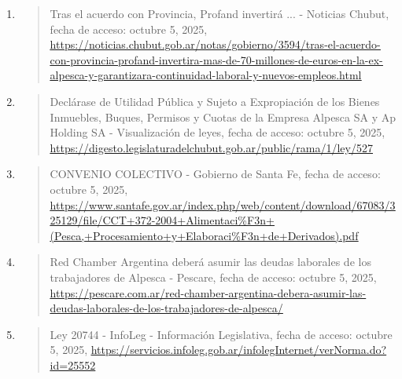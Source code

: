 \documentclass[]{article}
\begin{document}
\begin{enumerate}
\def\labelenumi{\arabic{enumi}.}
\item
  \begin{quote}
  Tras el acuerdo con Provincia, Profand invertirá ... - Noticias
  Chubut, fecha de acceso: octubre 5, 2025,
  \href{https://noticias.chubut.gob.ar/notas/gobierno/3594/tras-el-acuerdo-con-provincia-profand-invertira-mas-de-70-millones-de-euros-en-la-ex-alpesca-y-garantizara-continuidad-laboral-y-nuevos-empleos.html}{\uline{https://noticias.chubut.gob.ar/notas/gobierno/3594/tras-el-acuerdo-con-provincia-profand-invertira-mas-de-70-millones-de-euros-en-la-ex-alpesca-y-garantizara-continuidad-laboral-y-nuevos-empleos.html}}
  \end{quote}
\item
  \begin{quote}
  Declárase de Utilidad Pública y Sujeto a Expropiación de los Bienes
  Inmuebles, Buques, Permisos y Cuotas de la Empresa Alpesca SA y Ap
  Holding SA - Visualización de leyes, fecha de acceso: octubre 5, 2025,
  \href{https://digesto.legislaturadelchubut.gob.ar/public/rama/1/ley/527}{\uline{https://digesto.legislaturadelchubut.gob.ar/public/rama/1/ley/527}}
  \end{quote}
\item
  \begin{quote}
  CONVENIO COLECTIVO - Gobierno de Santa Fe, fecha de acceso: octubre 5,
  2025,
  \href{https://www.santafe.gov.ar/index.php/web/content/download/67083/325129/file/CCT+372-2004+Alimentaci\%F3n+(Pesca,+Procesamiento+y+Elaboraci\%F3n+de+Derivados).pdf}{\uline{https://www.santafe.gov.ar/index.php/web/content/download/67083/325129/file/CCT+372-2004+Alimentaci\%F3n+(Pesca,+Procesamiento+y+Elaboraci\%F3n+de+Derivados).pdf}}
  \end{quote}
\item
  \begin{quote}
  Red Chamber Argentina deberá asumir las deudas laborales de los
  trabajadores de Alpesca - Pescare, fecha de acceso: octubre 5, 2025,
  \href{https://pescare.com.ar/red-chamber-argentina-debera-asumir-las-deudas-laborales-de-los-trabajadores-de-alpesca/}{\uline{https://pescare.com.ar/red-chamber-argentina-debera-asumir-las-deudas-laborales-de-los-trabajadores-de-alpesca/}}
  \end{quote}
\item
  \begin{quote}
  Ley 20744 - InfoLeg - Información Legislativa, fecha de acceso:
  octubre 5, 2025,
  \href{https://servicios.infoleg.gob.ar/infolegInternet/verNorma.do?id=25552}{\uline{https://servicios.infoleg.gob.ar/infolegInternet/verNorma.do?id=25552}}

\end{quote}
\end{enumerate}
\end{document}
